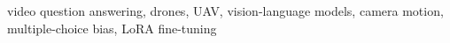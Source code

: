 \documentclass[conference]{IEEEtran}
\begin{document}
\begin{IEEEkeywords}
video question answering, drones, UAV, vision-language models,
camera motion, multiple-choice bias, LoRA fine-tuning
\end{IEEEkeywords}













\end{document}
